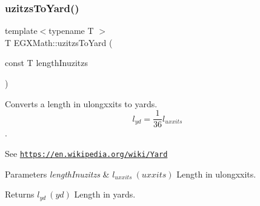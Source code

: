 \subsubsection{\texorpdfstring{uzitzs\+To\+Yard()}{uzitzsToYard()}}
{\footnotesize\ttfamily template$<$typename T $>$ \\
T E\+G\+X\+Math\+::uzitzs\+To\+Yard (\begin{DoxyParamCaption}\item[{const T}]{length\+Inuzitzs }\end{DoxyParamCaption})}



Converts a length in ulongxxits to yards. \[ l_{yd}= \frac{1}{36} l_{uxxits} \]. 

See \href{https://en.wikipedia.org/wiki/Yard}{\tt https\+://en.\+wikipedia.\+org/wiki/\+Yard} 
\begin{DoxyParams}{Parameters}
{\em length\+Inuzitzs} & $ l_{uxxits}\ (uxxits)$ Length in ulongxxits. \\
\hline
\end{DoxyParams}
\begin{DoxyReturn}{Returns}
$ l_{yd}\ (yd)$ Length in yards. 
\end{DoxyReturn}
